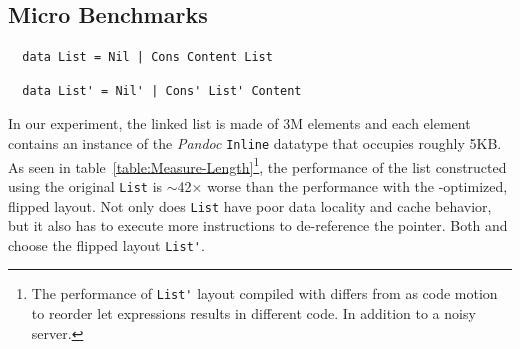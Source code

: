 \subsection{Micro Benchmarks}
\label{subsubsec:length}
\label{subsubsec:logic}

%
\begin{lstlisting}
  data List = Nil | Cons Content List
\end{lstlisting}
%
\begin{lstlisting}
  data List' = Nil' | Cons' List' Content
\end{lstlisting}
In our experiment, the linked list is made of 3M elements and each element contains
an instance of the \textit{Pandoc} \lstinline|Inline| datatype that occupies roughly 5KB.
%
As seen in table~\ref{table:Measure-Length}\footnote{The performance of \lstinline|List'| layout compiled with \gibbon differs from \system as code motion to reorder let expressions results in different code. In addition to a noisy server.}, the performance of the list constructed using the original \lstinline{List} is $\sim$42$\times$ worse than the performance with the \system-optimized, flipped layout.
%
Not only does \lstinline{List} have poor data locality and cache behavior,
but it also has to execute more instructions to de-reference the pointer.
Both \systemGreedy and \systemSolver choose the flipped layout \lstinline|List'|.
%

